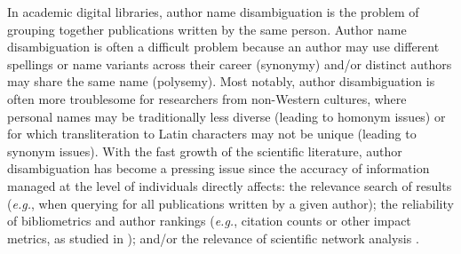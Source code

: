 \documentclass{article}
\newcommand{\eg}{\emph{e.g.}\xspace}
\begin{document}
In academic digital libraries, author name disambiguation is the problem of
grouping together publications written by the same person.
Author name disambiguation is often a difficult problem because an author may use different
spellings or name variants across their career (synonymy) and/or distinct authors may
share the same name (polysemy).
Most notably, author disambiguation is often more troublesome for researchers
from non-Western cultures, where personal names may be traditionally less diverse (leading to
homonym issues) or for which transliteration to Latin characters may not be unique (leading to
synonym issues).
With the fast growth of the scientific literature, author disambiguation has become a pressing
issue since the accuracy of information managed at the level of individuals directly affects:
the relevance search of results (\eg, when querying for all publications written by a given author);
the reliability of bibliometrics and author rankings (\eg, citation counts or other impact
metrics, as studied in \citep{strotmann2012author}); and/or the relevance of scientific network analysis
\citep{newman2001structure}.
\end{document}
